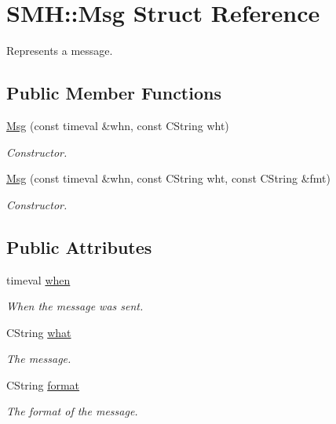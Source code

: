 \hypertarget{struct_s_m_h_1_1_msg}{}\section{S\+MH\+:\+:Msg Struct Reference}
\label{struct_s_m_h_1_1_msg}


Represents a message.  


\subsection*{Public Member Functions}
\begin{DoxyCompactItemize}
\item 
\hyperlink{struct_s_m_h_1_1_msg_a8c0752c26661975e08bdf6321eeea6b5}{Msg} (const timeval \&whn, const C\+String wht)
\begin{DoxyCompactList}\small\item\em Constructor. \end{DoxyCompactList}\item 
\mbox{\label{struct_s_m_h_1_1_msg_a551b4ddc00b63deeda549586a8f9813a}} 
\hyperlink{struct_s_m_h_1_1_msg_a551b4ddc00b63deeda549586a8f9813a}{Msg} (const timeval \&whn, const C\+String wht, const C\+String \&fmt)
\begin{DoxyCompactList}\small\item\em Constructor. \end{DoxyCompactList}\end{DoxyCompactItemize}
\subsection*{Public Attributes}
\begin{DoxyCompactItemize}
\item 
\mbox{\label{struct_s_m_h_1_1_msg_a4664e37839bff3c5ad44862d3da0baa5}} 
timeval \hyperlink{struct_s_m_h_1_1_msg_a4664e37839bff3c5ad44862d3da0baa5}{when}
\begin{DoxyCompactList}\small\item\em When the message was sent. \end{DoxyCompactList}\item 
\mbox{\label{struct_s_m_h_1_1_msg_afd60c6f95937d6ace7c19d08d56d8967}} 
C\+String \hyperlink{struct_s_m_h_1_1_msg_afd60c6f95937d6ace7c19d08d56d8967}{what}
\begin{DoxyCompactList}\small\item\em The message. \end{DoxyCompactList}\item 
\mbox{\label{struct_s_m_h_1_1_msg_adb69dae7cbf7847d8b317c62dca88168}} 
C\+String \hyperlink{struct_s_m_h_1_1_msg_adb69dae7cbf7847d8b317c62dca88168}{format}
\begin{DoxyCompactList}\small\item\em The format of the message. \end{DoxyCompactList}\end{DoxyCompactItemize}


